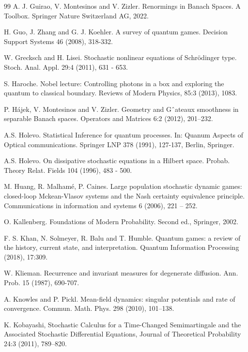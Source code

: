 \documentclass[12pt]{article}
\begin{document}
\begin{thebibliography}{99}
A. J. Guirao, V. Montesinos and
V. Zizler. Renormings in Banach Spaces. A Toolbox. Springer Nature Switzerland AG, 2022.

 H. Guo, J. Zhang and G. J. Koehler. A survey of quantum games.
 Decision Support Systems 46 (2008), 318-332.

W. Grecksch and H. Lisei. Stochastic nonlinear equations of Schr\"odinger type.
Stoch. Anal. Appl. 29:4 (2011), 631 - 653.

S. Haroche. Nobel lecture: Controlling photons in a box and exploring the
quantum to classical boundary. Reviews of Modern Physics, 85:3 (2013), 1083.

P. H\'ajek, V. Montesinos and V. Zizler.
Geometry and Gˆateaux smoothness in separable Banach
spaces. Operators and Matrices 6:2 (2012), 201–232.

  A.S. Holevo. Statistical Inference for quantum processes.
 In: Quanum Aspects of Optical communications.
Springer LNP 378 (1991), 127-137, Berlin, Springer.

  A.S. Holevo.
 On dissipative stochastic equations
in a Hilbert space. Probab. Theory Relat. Fields 104 (1996), 483 - 500.

M. Huang, R. Malham\'e, P. Caines. Large population stochastic dynamic games:
closed-loop Mckean-Vlasov systems and the Nash certainty equivalence principle.
Communications in information and systems 6 (2006), 221 -- 252.

 O. Kallenberg. Foundations of Modern Probability. Second ed., Springer, 2002.

 F. S. Khan, N. Solmeyer, R. Balu and T. Humble. Quantum games:
a review of the history, current state, and interpretation.
Quantum Information Processing (2018),  17:309.

W. Klieman. Recurrence and invariant measures for degenerate diffusion.
Ann. Prob. 15 (1987), 690-707.

A. Knowles and P. Pickl. Mean-field dynamics: singular potentials and rate of convergence. Commun. Math.
Phys. 298 (2010), 101–138.

K. Kobayashi, Stochastic Calculus for a Time-Changed Semimartingale and the Associated
Stochastic Differential Equations, Journal of Theoretical Probability 24:3 (2011),  789–820.


\end{thebibliography}
\end{document}
